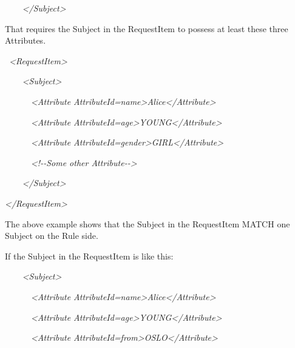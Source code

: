 \documentclass{article}
\begin{document}
{\color{black}
\textit{\ \ \ \ }\textit{{\textless}/Subject{\textgreater}}}

{\upshape\color{black}
That requires the Subject in the RequestItem to possess at least these
three Attributes.}

{\color{black}
\textit{\ }\textit{{\textless}RequestItem{\textgreater}}}

{\color{black}
\textit{\ \ \ \ }\textit{{\textless}Subject{\textgreater}}}

{\color{black}
\textit{\ \ \ \ \ \ }\textit{{\textless}Attribute
AttributeId={\textquotedbl}name{\textquotedbl}{\textgreater}Alice{\textless}/Attribute{\textgreater}}}

{\color{black}
\textit{\ \ \ \ \ \ }\textit{{\textless}Attribute
AttributeId={\textquotedbl}age{\textquotedbl}{\textgreater}YOUNG{\textless}/Attribute{\textgreater}}}

{\color{black}
\textit{\ \ \ \ \ \ }\textit{{\textless}Attribute
AttributeId={\textquotedbl}gender{\textquotedbl}{\textgreater}GIRL{\textless}/Attribute{\textgreater}}}

{\color{black}
\textit{\ \ \ \ \ \ }\textit{{\textless}!-{}-Some other
Attribute-{}-{\textgreater}}}

{\color{black}
\textit{\ \ \ \ }\textit{{\textless}/Subject{\textgreater}}}

{\itshape\color{black}
{\textless}/RequestItem{\textgreater}}

{\color{black}
The above example shows that the Subject in the RequestItem
{\textquotedbl}MATCH{\textquotedbl} one Subject on the Rule side.}

{\color{black}
If the Subject in the RequestItem is like this:}

{\color{black}
\textit{\ \ \ \ }\textit{{\textless}Subject{\textgreater}}}

{\color{black}
\textit{\ \ \ \ \ \ }\textit{{\textless}Attribute
AttributeId={\textquotedbl}name{\textquotedbl}{\textgreater}Alice{\textless}/Attribute{\textgreater}}}

{\color{black}
\textit{\ \ \ \ \ \ }\textit{{\textless}Attribute
AttributeId={\textquotedbl}age{\textgreater}YOUNG{\textless}/Attribute{\textgreater}}}

{\color{black}
\textit{\ \ \ \ \ \ }\textit{{\textless}Attribute
AttributeId={\textquotedbl}from{\textquotedbl}{\textgreater}OSLO{\textless}/Attribute{\textgreater}}}
\end{document}
